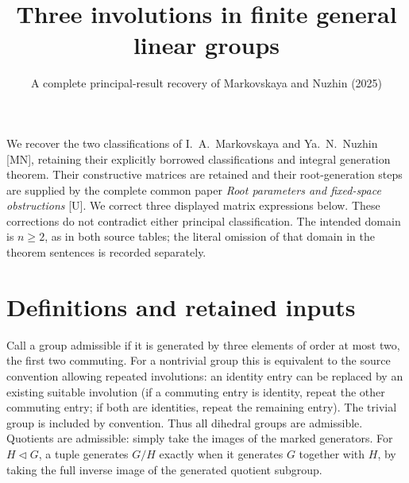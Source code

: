 \documentclass[11pt]{article}
\title{Three involutions in finite general linear groups}
\author{A complete principal-result recovery of Markovskaya and Nuzhin (2025)}
\date{}
\begin{document}
\maketitle
We recover the two classifications of I.~A.~Markovskaya and Ya.~N.~Nuzhin
[MN], retaining their explicitly borrowed classifications and integral
generation theorem. Their constructive matrices are retained and their
root-generation steps are supplied by the complete common paper
\emph{Root parameters and fixed-space obstructions} [U]. We correct three
displayed matrix expressions below. These corrections do not contradict
either principal classification. The intended domain is $n\geq2$, as in
both source tables; the literal omission of that domain in the theorem
sentences is recorded separately.

\section{Definitions and retained inputs}
Call a group admissible if it is generated by three elements of order at
most two, the first two commuting. For a nontrivial group this is equivalent
to the source convention allowing repeated involutions: an identity entry
can be replaced by an existing suitable involution (if a commuting entry
is identity, repeat the other commuting entry; if both are identities,
repeat the remaining entry). The trivial group is included by convention.
Thus all dihedral groups are admissible. Quotients are admissible: simply
take the images of the marked generators. For $H\lhd G$, a tuple generates
$G/H$ exactly when it generates $G$ together with $H$, by taking the full
inverse image of the generated quotient subgroup.
\end{document}
